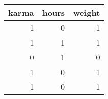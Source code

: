 \begin{tabular}{rrr}
\toprule
 karma &  hours &  weight \\
\midrule
     1 &      0 &       1 \\
     1 &      1 &       1 \\
     0 &      1 &       0 \\
     1 &      0 &       1 \\
     1 &      0 &       1 \\
\bottomrule
\end{tabular}
